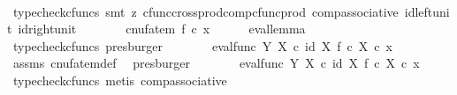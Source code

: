 \begin{isabellebody}
\ \ \ \ \isamarkupfalse%
\ {\isacharparenleft}{\kern0pt}typecheck{\isacharunderscore}{\kern0pt}cfuncs{\isacharcomma}{\kern0pt}\ smt\ {\isacharparenleft}{\kern0pt}z{}{\isacharparenright}{\kern0pt}\ cfunc{\isacharunderscore}{\kern0pt}cross{\isacharunderscore}{\kern0pt}prod{\isacharunderscore}{\kern0pt}comp{\isacharunderscore}{\kern0pt}cfunc{\isacharunderscore}{\kern0pt}prod\ comp{\isacharunderscore}{\kern0pt}associative{}\ id{\isacharunderscore}{\kern0pt}left{\isacharunderscore}{\kern0pt}unit{}\ id{\isacharunderscore}{\kern0pt}right{\isacharunderscore}{\kern0pt}unit{}{\isacharparenright}{\kern0pt}\isanewline
\ \ \isamarkupfalse%
\ \isamarkupfalse%
\ {\isachardoublequoteopen}{\isachardot}{\kern0pt}{\isachardot}{\kern0pt}{\isachardot}{\kern0pt}\ {\isacharequal}{\kern0pt}\ {\isacharparenleft}{\kern0pt}cnufatem\ f{\isacharparenright}{\kern0pt}\ {\isasymcirc}\isactrlsub c\ x{\isachardoublequoteclose}\isanewline
\ \ \ \ \isamarkupfalse%
\ eval{\isacharunderscore}{\kern0pt}lemma\ \isamarkupfalse%
\ {\isacharparenleft}{\kern0pt}typecheck{\isacharunderscore}{\kern0pt}cfuncs{\isacharcomma}{\kern0pt}\ presburger{\isacharparenright}{\kern0pt}\isanewline
\ \ \isamarkupfalse%
\ \isamarkupfalse%
\ {\isachardoublequoteopen}{\isachardot}{\kern0pt}{\isachardot}{\kern0pt}{\isachardot}{\kern0pt}\ {\isacharequal}{\kern0pt}\ {\isacharparenleft}{\kern0pt}eval{\isacharunderscore}{\kern0pt}func\ Y\ X\ {\isasymcirc}\isactrlsub c\ {\isasymlangle}id\ X{\isacharcomma}{\kern0pt}\ f\ {\isasymcirc}\isactrlsub c\ {\isasymbeta}\isactrlbsub X\isactrlesub {\isasymrangle}{\isacharparenright}{\kern0pt}\ {\isasymcirc}\isactrlsub c\ x{\isachardoublequoteclose}\isanewline
\ \ \ \ \isamarkupfalse%
\ assms\ cnufatem{\isacharunderscore}{\kern0pt}def{}\ \isamarkupfalse%
\ presburger\isanewline
\ \ \isamarkupfalse%
\ \isamarkupfalse%
\ {\isachardoublequoteopen}{\isachardot}{\kern0pt}{\isachardot}{\kern0pt}{\isachardot}{\kern0pt}\ {\isacharequal}{\kern0pt}\ eval{\isacharunderscore}{\kern0pt}func\ Y\ X\ {\isasymcirc}\isactrlsub c\ {\isasymlangle}id\ X{\isacharcomma}{\kern0pt}\ f\ {\isasymcirc}\isactrlsub c\ {\isasymbeta}\isactrlbsub X\isactrlesub {\isasymrangle}\ {\isasymcirc}\isactrlsub c\ x{\isachardoublequoteclose}\isanewline
\ \ \ \ \isamarkupfalse%
\ {\isacharparenleft}{\kern0pt}typecheck{\isacharunderscore}{\kern0pt}cfuncs{\isacharcomma}{\kern0pt}\ metis\ comp{\isacharunderscore}{\kern0pt}associative{}{\isacharparenright}{\kern0pt}\isanewline

\end{isabellebody}
